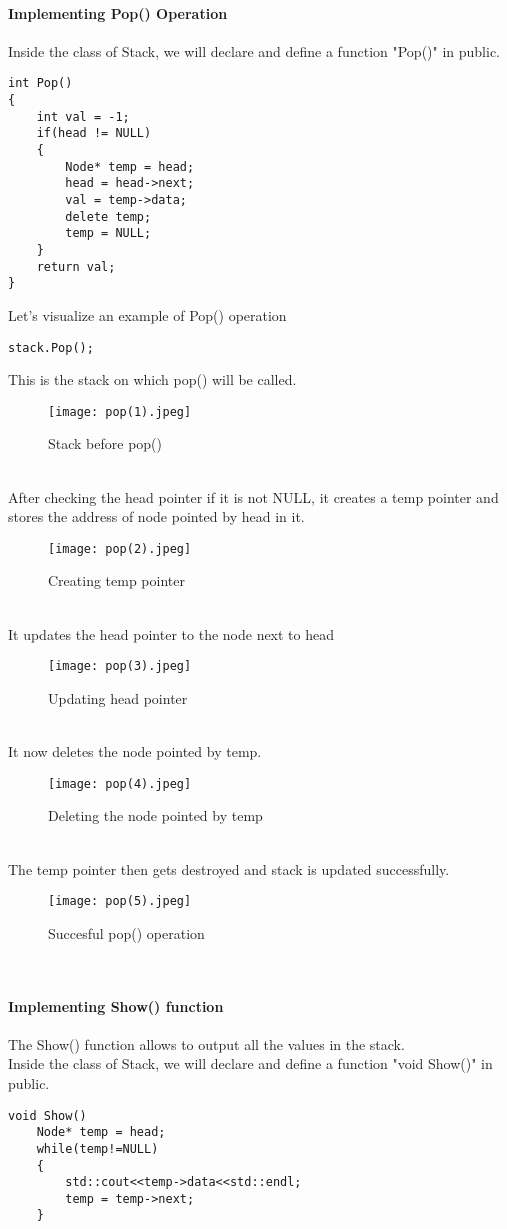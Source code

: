 \documentclass[11pt,fleqn]{book} %
\begin{document}
\paragraph{Implementing Pop() Operation}
Inside the class of Stack, we will declare and define a function "Pop()" in public.
\begin{lstlisting}
int Pop()
{
	int val = -1;
	if(head != NULL)
	{
		Node* temp = head;
		head = head->next;
		val = temp->data;
		delete temp;
		temp = NULL;
	}
	return val;
}
\end{lstlisting}
Let's visualize an example of Pop() operation
\begin{example}
	\begin{lstlisting}
stack.Pop();
	\end{lstlisting}

This is the stack on which pop() will be called.
\begin{figure}[H]
	\centering
	\texttt{[image: pop(1).jpeg]}
	\caption{Stack before pop()}
\end{figure} ~\\
After checking the head pointer if it is not NULL, it creates a temp pointer and stores the address of node pointed by head in it.
\begin{figure}[H]
	\centering
	\texttt{[image: pop(2).jpeg]}
	\caption{Creating temp pointer}
\end{figure} ~\\
It updates the head pointer to the node next to head
\begin{figure}[H]
	\centering
	\texttt{[image: pop(3).jpeg]}
	\caption{Updating head pointer}
\end{figure} ~\\
It now deletes the node pointed by temp.
\begin{figure}[H]
	\centering
	\texttt{[image: pop(4).jpeg]}
	\caption{Deleting the node pointed by temp}
\end{figure} ~\\
The temp pointer then gets destroyed and stack is updated successfully.
\begin{figure}[H]
	\centering
	\texttt{[image: pop(5).jpeg]}
	\caption{Succesful pop() operation}
\end{figure}
\end{example} ~\\
\paragraph{Implementing Show() function}
The Show()  function allows to output all the values in the stack. \\
Inside the class of Stack, we will declare and define a function "void Show()" in public.
\begin{lstlisting}
void Show()
	Node* temp = head;
	while(temp!=NULL)
	{
		std::cout<<temp->data<<std::endl;
		temp = temp->next;
	}
\end{lstlisting}
\end{document}
